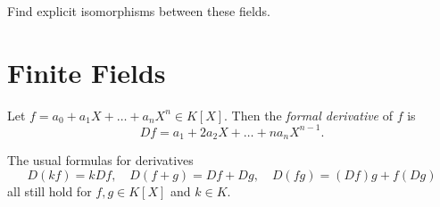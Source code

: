 \begin{exercise}
  Find explicit isomorphisms between these
  fields.
\end{exercise}

\section{Finite Fields}
\begin{definition}
Let $f = a_0 + a_1 X + \dots + a_n X^n \in K[X]$. Then
the \emph{formal derivative} of $f$ is
\[
  Df = a_1 + 2a_2 X + \dots + n a_n X^{n-1}.
\]
\end{definition}

\begin{exercise}
  The usual formulas for derivatives
  \[
    D(kf) = k Df, \quad D(f + g) = Df + Dg, \quad
    D(fg) = (Df)g + f(Dg)
  \]
  all still hold for $f, g \in K[X]$ and $k \in K$.
\end{exercise}
